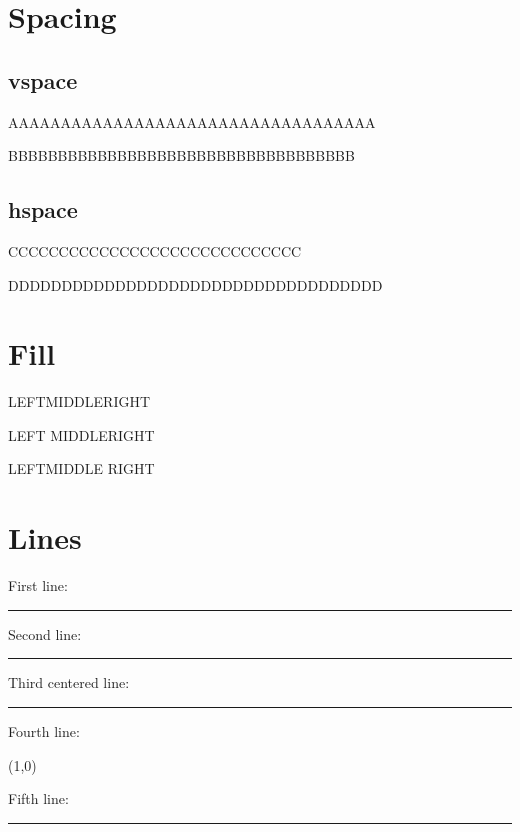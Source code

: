 \documentclass{article}
\begin{document}
\section{Spacing}

\subsection{vspace}

AAAAAAAAAAAAAAAAAAAAAAAAAAAAAAAAAAA

\vspace{2cm}
BBBBBBBBBBBBBBBBBBBBBBBBBBBBBBBBBBB

\subsection{hspace}

CCCCCCCCCCC\hspace{2cm}CCCCCCCCCCCCCCCCCC

DDDDDDDDDDDDDDDDDDDDDDDDDDDDDDDDDDD



\section{Fill}

LEFT\hfill MIDDLE\hfill RIGHT

LEFT \hfill MIDDLE\hfill RIGHT

LEFT\hfill MIDDLE \hfill RIGHT



\newpage
\section{Lines}

First line:

\noindent\rule{8cm}{0.4pt}

Second line:

\noindent\rule{\textwidth}{0.4pt}

\blindtext

Third centered line:

\begin{center}
    \noindent\rule{8cm}{0.4pt}
\end{center}
\vspace{-5mm}

\blindtext

Fourth line:

\begin{center}\line(1,0){\textwidth}\end{center}

Fifth line:

\textcolor{red}{\noindent\rule{\textwidth}{0.4pt}}
\end{document}
